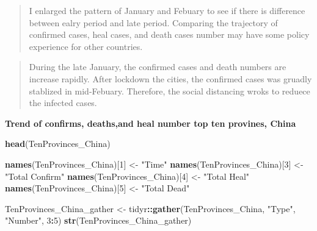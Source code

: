 \documentclass[12pt,]{article}
\newenvironment{Shaded}{\begin{snugshade}}{\end{snugshade}}
\newcommand{\DecValTok}[1]{\textcolor[rgb]{0.00,0.00,0.81}{#1}}
\newcommand{\KeywordTok}[1]{\textcolor[rgb]{0.13,0.29,0.53}{\textbf{#1}}}
\newcommand{\NormalTok}[1]{#1}
\newcommand{\OperatorTok}[1]{\textcolor[rgb]{0.81,0.36,0.00}{\textbf{#1}}}
\newcommand{\StringTok}[1]{\textcolor[rgb]{0.31,0.60,0.02}{#1}}
\begin{document}
\begin{quote}
I enlarged the pattern of January and Febuary to see if there is
difference between ealry period and late period. Comparing the
trajectory of confirmed cases, heal cases, and death cases number may
have some policy experience for other countries.
\end{quote}

\begin{quote}
During the late January, the confirmed cases and death numbers are
increase rapidly. After lockdown the cities, the confirmed cases was
gruadly stablized in mid-Febuary. Therefore, the social distancing wroks
to reduece the infected cases.
\end{quote}

\textbf{Trend of confirms, deaths,and heal number top ten provines,
China}

\begin{Shaded}
\begin{Highlighting}[]
\KeywordTok{head}\NormalTok{(TenProvinces_China)}

\KeywordTok{names}\NormalTok{(TenProvinces_China)[}\DecValTok{1}\NormalTok{] <-}\StringTok{ "Time"}
\KeywordTok{names}\NormalTok{(TenProvinces_China)[}\DecValTok{3}\NormalTok{] <-}\StringTok{ "Total Confirm"}
\KeywordTok{names}\NormalTok{(TenProvinces_China)[}\DecValTok{4}\NormalTok{] <-}\StringTok{ "Total Heal"}
\KeywordTok{names}\NormalTok{(TenProvinces_China)[}\DecValTok{5}\NormalTok{] <-}\StringTok{ "Total Dead"}

\NormalTok{TenProvinces_China_gather <-}\StringTok{ }\NormalTok{tidyr}\OperatorTok{::}\KeywordTok{gather}\NormalTok{(TenProvinces_China, }\StringTok{"Type"}\NormalTok{, }\StringTok{"Number"}\NormalTok{, }\DecValTok{3}\OperatorTok{:}\DecValTok{5}\NormalTok{)}
\KeywordTok{str}\NormalTok{(TenProvinces_China_gather)}
\end{Highlighting}
\end{Shaded}
\end{document}
